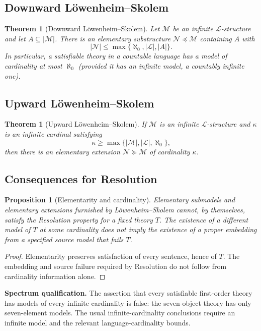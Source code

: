 \documentclass[11pt]{article}
\newtheorem{theorem}[definition]{Theorem}
\newtheorem{proposition}[definition]{Proposition}
\newcommand{\card}[1]{\lvert #1\rvert}
\begin{document}
\subsection{Downward L\"owenheim--Skolem}
\begin{theorem}[Downward L\"owenheim--Skolem]
Let $\mathcal M$ be an infinite $\mathcal L$-structure and let $A\subseteq\card{\mathcal M}$. There is an elementary substructure $\mathcal N\preccurlyeq\mathcal M$ containing $A$ with
\[
\card{\mathcal N}\leq\max\{\aleph_0,\card{\mathcal L},\card{A}\}.
\]
In particular, a satisfiable theory in a countable language has a model of cardinality at most $\aleph_0$ (provided it has an infinite model, a countably infinite one).
\end{theorem}
\subsection{Upward L\"owenheim--Skolem}
\begin{theorem}[Upward L\"owenheim--Skolem]
If $\mathcal M$ is an infinite $\mathcal L$-structure and $\kappa$ is an infinite cardinal satisfying
\[\kappa\geq\max\{\card{\mathcal M},\card{\mathcal L},\aleph_0\},\]
then there is an elementary extension $\mathcal N\succcurlyeq\mathcal M$ of cardinality $\kappa$.
\end{theorem}
\subsection{Consequences for Resolution}
\begin{proposition}[Elementarity and cardinality]
Elementary submodels and elementary extensions furnished by L\"owenheim--Skolem cannot, by themselves, satisfy the Resolution property for a fixed theory $T$. The existence of a different model of $T$ at some cardinality does not imply the existence of a proper embedding from a specified source model that fails $T$.
\end{proposition}
\begin{proof}
Elementarity preserves satisfaction of every sentence, hence of $T$. The embedding and source failure required by Resolution do not follow from cardinality information alone.
\end{proof}
\noindent\textbf{Spectrum qualification.} The assertion that every satisfiable first-order theory has models of every infinite cardinality is false: the seven-object theory has only seven-element models. The usual infinite-cardinality conclusions require an infinite model and the relevant language-cardinality bounds.
\end{document}
